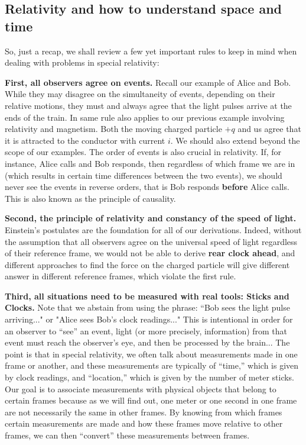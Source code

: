 \documentclass[a4paper,11pt]{article}
\numberwithin{equation}{section}
\begin{document}
 \subsection{Relativity and how to understand space and time}
  So, just a recap, we shall review a few yet important rules to keep in mind when dealing with problems in special relativity:
  
 \textbf{First, all observers agree on events.} Recall our example of Alice and Bob. While they may disagree on the simultaneity of events, depending on their relative motions, they must and always agree that the light pulses arrive at the ends of the train. In same rule also applies to our previous example involving relativity and magnetism. Both the moving charged particle $+q$ and us agree that it is attracted to the conductor with current $i$. We should also extend beyond the scope of our examples. The order of events is also crucial in relativity. If, for instance, Alice calls and Bob responds, then regardless of which frame we are in (which results in certain time differences between the two events), we should never see the events in reverse orders, that is Bob responds \textbf{before} Alice calls. This is also known as the principle of causality.
 
 \textbf{Second, the principle of relativity and constancy of the speed of light.} Einstein's postulates are the foundation for all of our derivations. Indeed, without the assumption that all observers agree on the universal speed of light regardless of their reference frame, we would not be able to derive \textbf{rear clock ahead}, and different approaches to find the force on the charged particle will give different answer in different reference frames, which violate the first rule.
 
 \textbf{Third, all situations need to be measured with real tools: Sticks and Clocks.} Note that we abstain from using the phrase: ``Bob sees the light pulse arriving..." or "Alice sees Bob's clock readings..." This is intentional in order for an observer to ``see'' an event, light (or more precisely, information) from that event must reach the observer's eye, and then be processed by the brain... The point is that in special relativity, we often talk about measurements made in one frame or another, and these measurements are typically of ``time,'' which is given by clock readings, and ``location,'' which is given by the number of meter sticks. Our goal is to associate measurements with physical objects that belong to certain frames because as we will find out, one meter or one second in one frame are not necessarily the same in other frames. By knowing from which frames certain measurements are made and how these frames move relative to other frames, we can then ``convert'' these measurements between frames. 
\end{document}
